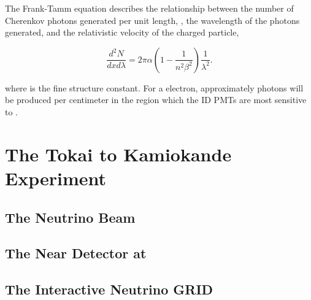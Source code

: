 The Frank-Tamm equation \cite{Frank1991-wj} describes the relationship between the number of Cherenkov photons generated per unit length, , the wavelength of the photons generated, \quickmath{\lambda} and the relativistic velocity of the charged particle,

\begin{equation}
  \label{eq:T2KSKExp_FrankTammFormula}
  \frac{d^2N}{dxd\lambda} = 2\pi\alpha \left(1 - \frac{1}{n^2 \beta^2} \right)\frac{1}{\lambda^2} .
\end{equation}

where \quickmath{\alpha} is the fine structure constant. For a  electron, approximately  photons will be produced per centimeter in the  region which the ID PMTs are most sensitive to \cite{Fukuda2003-ly}.


\section{The Tokai to Kamiokande Experiment}
\label{sec:T2KSKExp_T2K}

\subsection{The Neutrino Beam}
\label{subsec:T2KSKExp_T2K_NeutrinoBeam}

\subsection{The Near Detector at }
\label{subsec:T2KSKExp_T2K_ND280}

\subsection{The Interactive Neutrino GRID}
\label{subsec:T2KSKExp_T2K_INGRID}

